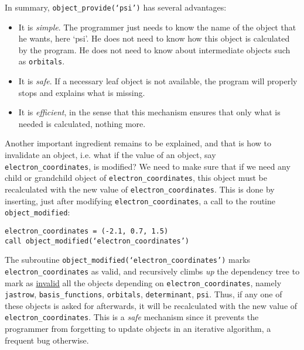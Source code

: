 \documentclass[letter,11pt]{article}
\newcommand\Def[1]{\underline{#1}}
\begin{document}
In summary, {\tt object_provide(`psi')} has several advantages:
\begin{itemize}
\item It is {\it simple}. The programmer just needs to know the name of the object that he wants, here `psi'. He does not need to know how this object is calculated by the program. He does not need to know about intermediate objects such as {\tt orbitals}.
\item It is {\it safe}. If a necessary leaf object is not available, the program will properly stops and explains what is missing.
\item It is {\it efficient}, in the sense that this mechanism ensures that only what is needed is calculated, nothing more.
\end{itemize}

\vspace{0.5cm}

Another important ingredient remains to be explained, and that is how to invalidate an object, i.e.
what if the value of an object, say {\tt electron_coordinates}, is modified?
We need to make sure that if we need any child or grandchild object of {\tt electron_coordinates},
this object must be recalculated with the new value of {\tt electron_coordinates}.
This is done by inserting, just after modifying {\tt electron_coordinates},
a call to the routine {\tt object_modified}:

\vspace{0.5cm}
\noindent
{\tt electron_coordinates = (-2.1, 0.7, 1.5)\\
call object_modified(`electron_coordinates')
}

\vspace{0.5cm}
The subroutine {\tt object_modified(`electron_coordinates')} marks {\tt electron_coordinates} as valid, and recursively climbs {\it up} the dependency tree to mark as \Def{invalid} all the objects depending on {\tt electron_coordinates}, namely {\tt jastrow},  {\tt basis_functions}, {\tt orbitals}, {\tt determinant}, {\tt psi}. 
Thus, if any one of these objects is asked for afterwards, it will be recalculated with the new value of {\tt electron_coordinates}. This is a {\it safe} mechanism since it prevents the programmer from forgetting to update objects in an iterative algorithm, a frequent bug otherwise.
\end{document}

